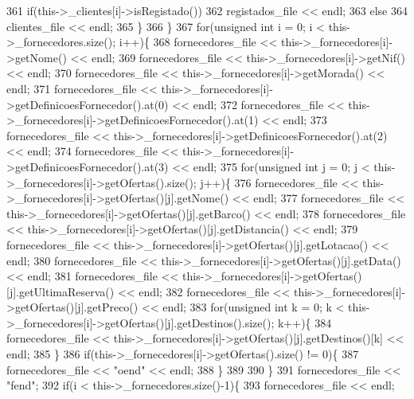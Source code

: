 \begin{DoxyCode}
361             \textcolor{keywordflow}{if}(this->\_clientes[i]->isRegistado())
362                         registados\_file << endl;
363             \textcolor{keywordflow}{else}
364                         clientes\_file << endl;
365         \}
366     \}
367     \textcolor{keywordflow}{for}(\textcolor{keywordtype}{unsigned} \textcolor{keywordtype}{int} i = 0; i < this->\_fornecedores.size(); i++)\{
368         fornecedores\_file << this->\_fornecedores[i]->getNome() << endl;
369         fornecedores\_file << this->\_fornecedores[i]->getNif() << endl;
370         fornecedores\_file << this->\_fornecedores[i]->getMorada() << endl;
371         fornecedores\_file << this->\_fornecedores[i]->getDefinicoesFornecedor().at(0) << endl;
372         fornecedores\_file << this->\_fornecedores[i]->getDefinicoesFornecedor().at(1) << endl;
373         fornecedores\_file << this->\_fornecedores[i]->getDefinicoesFornecedor().at(2) << endl;
374         fornecedores\_file << this->\_fornecedores[i]->getDefinicoesFornecedor().at(3) << endl;
375         \textcolor{keywordflow}{for}(\textcolor{keywordtype}{unsigned} \textcolor{keywordtype}{int} j = 0; j < this->\_fornecedores[i]->getOfertas().size(); j++)\{
376             fornecedores\_file << this->\_fornecedores[i]->getOfertas()[j].getNome() << endl;
377             fornecedores\_file << this->\_fornecedores[i]->getOfertas()[j].getBarco() << endl;
378             fornecedores\_file << this->\_fornecedores[i]->getOfertas()[j].getDistancia() << endl;
379             fornecedores\_file << this->\_fornecedores[i]->getOfertas()[j].getLotacao() << endl;
380             fornecedores\_file << this->\_fornecedores[i]->getOfertas()[j].getData() << endl;
381             fornecedores\_file << this->\_fornecedores[i]->getOfertas()[j].getUltimaReserva() << endl;
382             fornecedores\_file << this->\_fornecedores[i]->getOfertas()[j].getPreco() << endl;
383             \textcolor{keywordflow}{for}(\textcolor{keywordtype}{unsigned} \textcolor{keywordtype}{int} k = 0; k < this->\_fornecedores[i]->getOfertas()[j].getDestinos().size(); k++)\{
384                 fornecedores\_file << this->\_fornecedores[i]->getOfertas()[j].getDestinos()[k] << endl;
385             \}
386             \textcolor{keywordflow}{if}(this->\_fornecedores[i]->getOfertas().size() != 0)\{
387                 fornecedores\_file << \textcolor{stringliteral}{"oend"} << endl;
388             \}
389 
390         \}
391         fornecedores\_file << \textcolor{stringliteral}{"fend"};
392         \textcolor{keywordflow}{if}(i < this->\_fornecedores.size()-1)\{
393             fornecedores\_file << endl;

\end{DoxyCode}
